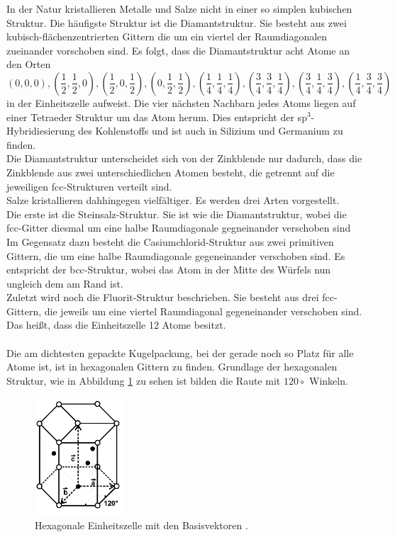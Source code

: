 In der Natur kristallieren Metalle und Salze nicht in einer so simplen kubischen Struktur. 
Die häufigste Struktur ist die Diamantstruktur. 
Sie besteht aus  zwei kubisch-flächenzentrierten Gittern die um ein viertel der Raumdiagonalen zueinander vorschoben sind. 
Es folgt, dass die Diamantstruktur acht Atome an den Orten
\begin{equation}
(0,0,0), \left(\frac{1}{2}, \frac{1}{2}, 0 \right), \left(\frac{1}{2}, 0, \frac{1}{2} \right), \left(0, \frac{1}{2}, \frac{1}{2} \right), \left(\frac{1}{4}, \frac{1}{4}, \frac{1}{4} \right), \left(\frac{3}{4}, \frac{3}{4}, \frac{1}{4} \right), \left(\frac{3}{4}, \frac{1}{4}, \frac{3}{4} \right),  \left(\frac{1}{4}, \frac{3}{4}, \frac{3}{4} \right)
\end{equation}
in der Einheitszelle aufweist.
Die vier nächsten Nachbarn jedes Atoms liegen auf einer Tetraeder Struktur um das Atom herum.
Dies entspricht der sp$^3$-Hybridiesierung des Kohlenstoffs und ist auch in Silizium und Germanium zu finden.\\
Die Diamantstruktur unterscheidet sich von der Zinkblende nur dadurch, dass die Zinkblende aus zwei unterschiedlichen Atomen besteht, die getrennt auf die jeweiligen fcc-Strukturen verteilt sind.\\
Salze kristallieren dahhingegen vielfältiger.
Es werden drei Arten vorgestellt.\\
Die erste ist die Steinsalz-Struktur. 
Sie ist wie die Diamantstruktur, wobei die fcc-Gitter diesmal um eine halbe Raumdiagonale gegneinander verschoben sind\\
Im Gegensatz dazu besteht die Casiumchlorid-Struktur aus zwei primitiven Gittern, die um eine halbe Raumdiagonale gegeneinander verschoben sind. 
Es entspricht der bcc-Struktur, wobei das Atom in der Mitte des Würfels nun ungleich dem am Rand ist.\\
Zuletzt wird noch die Fluorit-Struktur beschrieben.
Sie besteht aus drei fcc-Gittern, die jeweils um eine viertel Raumdiagonal gegeneinander verschoben sind. 
Das heißt, dass die Einheitszelle 12 Atome besitzt.\\\\
Die am dichtesten gepackte Kugelpackung, bei der gerade noch so Platz für alle Atome ist, ist in hexagonalen Gittern zu finden. 
Grundlage der hexagonalen Struktur, wie in Abbildung \ref{fig:hexagonal} zu sehen ist bilden die Raute mit $120\circ$  Winkeln.
\begin{figure}[h]
	\centering
	\includegraphics[width = 0.3\textwidth]{Abbildungen/hexagonal.png}
	\caption{Hexagonale Einheitszelle mit den Basisvektoren \cite{Anleitung}. }
	\label{fig:hexagonal}
\end{figure} 
